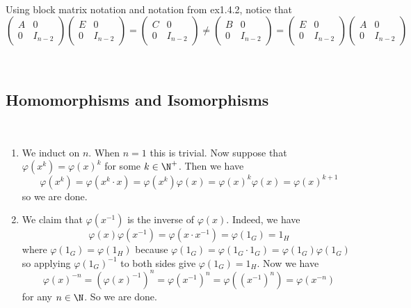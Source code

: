 \documentclass[a4paper]{article}
\begin{document}
\begin{ex}{}{}\\
Using block matrix notation and notation from ex1.4.2, notice that $$\begin{pmatrix}
A & 0\\
0 & I_{n-2}
\end{pmatrix}\begin{pmatrix}
E & 0\\
0 & I_{n-2}
\end{pmatrix}=\begin{pmatrix}
C & 0\\
0 & I_{n-2}
\end{pmatrix}\neq\begin{pmatrix}
B & 0\\
0 & I_{n-2}
\end{pmatrix}=\begin{pmatrix}
E & 0\\
0 & I_{n-2}
\end{pmatrix}\begin{pmatrix}
A & 0\\
0 & I_{n-2}
\end{pmatrix}$$
\end{ex}

\begin{ex}{}{}\\

\end{ex}

\subsection{}
\subsection{Homomorphisms and Isomorphisms}
\begin{ex}{}{}\\
\begin{enumerate}[label=(\alph*)]
\item We induct on $n$. When $n=1$ this is trivial. Now suppose that $\varphi(x^k)=\varphi(x)^k$ for some $k\in\N^+$. Then we have $$\varphi(x^k)=\varphi(x^k\cdot x)=\varphi(x^k)\varphi(x)=\varphi(x)^k\varphi(x)=\varphi(x)^{k+1}$$ so we are done. 
\item We claim that $\varphi(x^{-1})$ is the inverse of $\varphi(x)$. Indeed, we have $$\varphi(x)\varphi(x^{-1})=\varphi(x\cdot x^{-1})=\varphi(1_G)=1_H$$ where $\varphi(1_G)=\varphi(1_H)$ because $\varphi(1_G)=\varphi(1_G\cdot 1_G)=\varphi(1_G)\varphi(1_G)$ so applying $\varphi(1_G)^{-1}$ to both sides give $\varphi(1_G)=1_H$. Now we have $$\varphi(x)^{-n}=(\varphi(x)^{-1})^n=\varphi(x^{-1})^n=\varphi((x^{-1})^n)=\varphi(x^{-n})$$ for any $n\in\N$. So we are done. 
\end{enumerate}
\end{ex}
\end{document}
